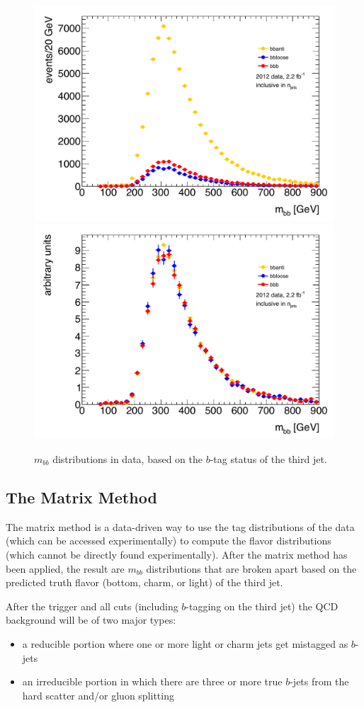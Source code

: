 \begin{figure}[hbt]
  \includegraphics[width=0.5\linewidth]{BackgroundEstimation/images/mbb_bbb_bbloose_bbanti_r200-215.pdf}
  \includegraphics[width=0.5\linewidth]{BackgroundEstimation/images/mbb_bbb_bbloose_bbanti_r200-215_normalized.pdf}
  \caption{$m_{bb}$ distributions in data, based on the $b$-tag status of the third jet. 
    \label{fig:mbb_data} }
\end{figure}


\subsection{The Matrix Method}
The matrix method is a data-driven way to use the tag distributions of the data (which can be accessed experimentally) to compute the flavor distributions (which cannot be directly found experimentally).  After the matrix method has been applied, the result are $m_{bb}$ distributions that are broken apart based on the predicted truth flavor (bottom, charm, or light) of the third jet.  

After the trigger and all cuts (including $b$-tagging on the third jet) the QCD background will be of two major types:

\begin{itemize}
    \item a reducible portion where one or more light or charm jets get mistagged as $b$-jets
    \item an irreducible portion in which there are three or more true $b$-jets from the
hard scatter and/or gluon splitting
\end{itemize}



